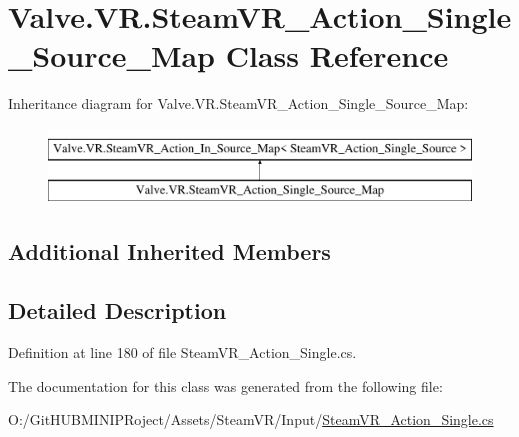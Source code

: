 \hypertarget{class_valve_1_1_v_r_1_1_steam_v_r___action___single___source___map}{}\section{Valve.\+V\+R.\+Steam\+V\+R\+\_\+\+Action\+\_\+\+Single\+\_\+\+Source\+\_\+\+Map Class Reference}
\label{class_valve_1_1_v_r_1_1_steam_v_r___action___single___source___map}
Inheritance diagram for Valve.\+V\+R.\+Steam\+V\+R\+\_\+\+Action\+\_\+\+Single\+\_\+\+Source\+\_\+\+Map\+:\begin{figure}[H]
\begin{center}
\leavevmode
\includegraphics[height=2.000000cm]{class_valve_1_1_v_r_1_1_steam_v_r___action___single___source___map}
\end{center}
\end{figure}
\subsection*{Additional Inherited Members}


\subsection{Detailed Description}


Definition at line 180 of file Steam\+V\+R\+\_\+\+Action\+\_\+\+Single.\+cs.



The documentation for this class was generated from the following file\+:\begin{DoxyCompactItemize}
\item 
O\+:/\+Git\+H\+U\+B\+M\+I\+N\+I\+P\+Roject/\+Assets/\+Steam\+V\+R/\+Input/\mbox{\hyperlink{_steam_v_r___action___single_8cs}{Steam\+V\+R\+\_\+\+Action\+\_\+\+Single.\+cs}}\end{DoxyCompactItemize}

